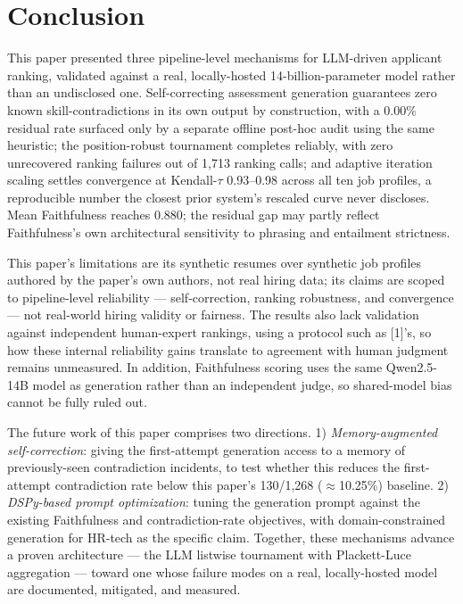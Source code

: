 \documentclass[journal]{IEEEtran}
\begin{document}
\section{Conclusion}
This paper presented three pipeline-level mechanisms for LLM-driven applicant ranking, validated against a real, locally-hosted 14-billion-parameter model rather than an undisclosed one. Self-correcting assessment generation guarantees zero known skill-contradictions in its own output by construction, with a 0.00\% residual rate surfaced only by a separate offline post-hoc audit using the same heuristic; the position-robust tournament completes reliably, with zero unrecovered ranking failures out of 1,713 ranking calls; and adaptive iteration scaling settles convergence at Kendall-$\tau$ 0.93--0.98 across all ten job profiles, a reproducible number the closest prior system's rescaled curve never discloses. Mean Faithfulness reaches 0.880; the residual gap may partly reflect Faithfulness's own architectural sensitivity to phrasing and entailment strictness.

This paper's limitations are its synthetic resumes over synthetic job profiles authored by the paper's own authors, not real hiring data; its claims are scoped to pipeline-level reliability --- self-correction, ranking robustness, and convergence --- not real-world hiring validity or fairness. The results also lack validation against independent human-expert rankings, using a protocol such as [1]'s, so how these internal reliability gains translate to agreement with human judgment remains unmeasured. In addition, Faithfulness scoring uses the same Qwen2.5-14B model as generation rather than an independent judge, so shared-model bias cannot be fully ruled out.

The future work of this paper comprises two directions. 1) \emph{Memory-augmented self-correction}: giving the first-attempt generation access to a memory of previously-seen contradiction incidents, to test whether this reduces the first-attempt contradiction rate below this paper's 130/1,268 ($\approx$10.25\%) baseline. 2) \emph{DSPy-based prompt optimization}: tuning the generation prompt against the existing Faithfulness and contradiction-rate objectives, with domain-constrained generation for HR-tech as the specific claim. Together, these mechanisms advance a proven architecture --- the LLM listwise tournament with Plackett-Luce aggregation --- toward one whose failure modes on a real, locally-hosted model are documented, mitigated, and measured.
\end{document}
